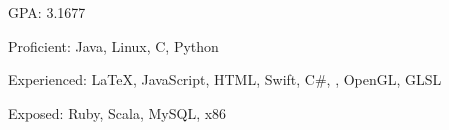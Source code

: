 
  
  

\def\awards{
{\large\color{emphasis}3A UIL State Academic Contest}\\
{\small\makebox[0.5\linewidth][l]{\faCalendar \hspace{0.5em}2014 -- 2017}}\\
{\small\makebox[0.5\linewidth][l]{Computer Science -- Individual -- 3x1st, 1x2nd}}\\
{\small\makebox[0.5\linewidth][l]{Computer Applications -- Individual -- 1x1st, 1x2nd}}\\
{\small\makebox[0.5\linewidth][l]{Computer Science -- Team -- 2x1st, 1x2nd}}\\
{\small\makebox[0.5\linewidth][l]{Mathematics -- Team -- 1x2nd}}
}



\divider

GPA: 3.1677\







{\color{black} Proficient:} Java, Linux, C, Python

{\color{black} Experienced:} \LaTeX, JavaScript, HTML, Swift, C\#, \cpp, OpenGL, GLSL

{\color{black} Exposed:} Ruby, Scala, MySQL, x86




